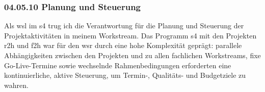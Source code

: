 \subsubsection*{04.05.10 Planung und Steuerung} 
\label{sec:04.05.10.PlanungUndSteuerung}

\par Als \gls{wsl} im \gls{s4} trug ich die Verantwortung für die Planung und Steuerung der Projektaktivitäten in meinem Workstream. Das Programm \gls{s4} mit den Projekten \gls{r2h} und \gls{f2h} war für den \gls{wsr} durch eine hohe Komplexität geprägt: parallele Abhängigkeiten zwischen den Projekten und zu allen fachlichen Workstreams, fixe  Go-Live-Termine sowie wechselnde Rahmenbedingungen erforderten eine kontinuierliche, aktive Steuerung, um Termin-, Qualitäts- und Budgetziele zu wahren.